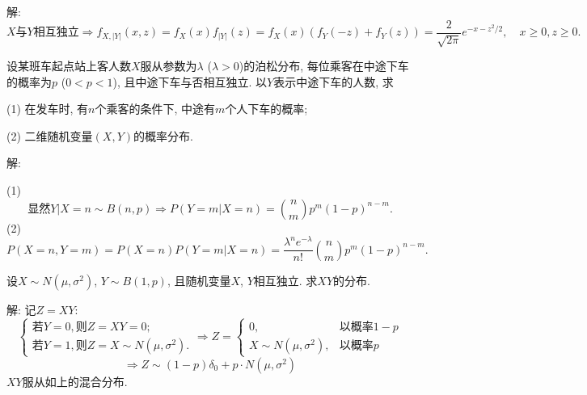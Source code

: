\documentclass[standard]{ExBook}
\renewenvironment{shaded}{%
  \def\FrameCommand{\fboxsep=\FrameSep \colorbox{shadecolor}}%
  \MakeFramed{\advance\hsize-\width \FrameRestore}%
}{%
  \endMakeFramed
}
\begin{document}
\begin{qitems}
\vspace{\dimexpr2.5cm-5em\relax}

解: 
$$X\text{与}Y\text{相互独立} \Longrightarrow f_{X,|Y|}(x,z)=f_{X}(x)f_{|Y|}(z)=f_{X}(x)(f_{Y}(-z)+f_{Y}(z))=\frac{2}{\sqrt{2\pi}}e^{-x-z^2/2},\quad x\geq 0,z\geq 0.$$

\vspace{2.5cm-5em}

    \begin{bbox}
    \begin{shaded}
        \qitem
设某班车起点站上客人数$X$服从参数为$\lambda$ ($\lambda>0$)的泊松分布, 每位乘客在中途下车的概率为$p$ ($0 < p < 1$), 且中途下车与否相互独立. 以$Y$表示中途下车的人数, 求

(1) 在发车时, 有$n$个乘客的条件下, 中途有$m$个人下车的概率;

(2) 二维随机变量$(X,Y)$的概率分布.
    \end{shaded}
    \end{bbox}

\vspace{\dimexpr2.5cm-5em\relax}

解: 

(1) 
$$\text{显然}Y|X=n\sim B(n,p) \Longrightarrow P(Y=m|X=n)=\binom{n}{m}p^{m}(1-p)^{n-m}.$$
(2)
$$P(X=n,Y=m)=P(X=n)P(Y=m|X=n)=\frac{\lambda^{n}e^{-\lambda}}{n!}\binom{n}{m}p^{m}(1-p)^{n-m}.$$

\vspace{2.5cm-5em}

    \begin{bbox}
    \begin{shaded}
        \qitem
设$X\sim N(\mu,\sigma^2)$, $Y\sim B(1,p)$, 且随机变量$X$, $Y$相互独立. 求$XY$的分布.
    \end{shaded}
    \end{bbox}

\vspace{\dimexpr2.5cm-5em\relax}

解: 
记$Z=XY$:
$$
    \left\{
    \begin{array}{l}
        \text{若}Y=0, \text{则}Z=XY=0;\\
        \text{若}Y=1, \text{则}Z=X\sim N(\mu,\sigma^2).
    \end{array}
    \right.
    \Longrightarrow
    Z=
    \left\{
    \begin{array}{ll}
        0, & \text{以概率}1-p\\
        X\sim N(\mu,\sigma^2), & \text{以概率}p
    \end{array}
    \right.
$$
$$
    \Longrightarrow
    Z\sim (1-p)\delta_0+p\cdot N(\mu,\sigma^2)
$$
$XY$服从如上的混合分布.


\end{qitems}
\end{document}
